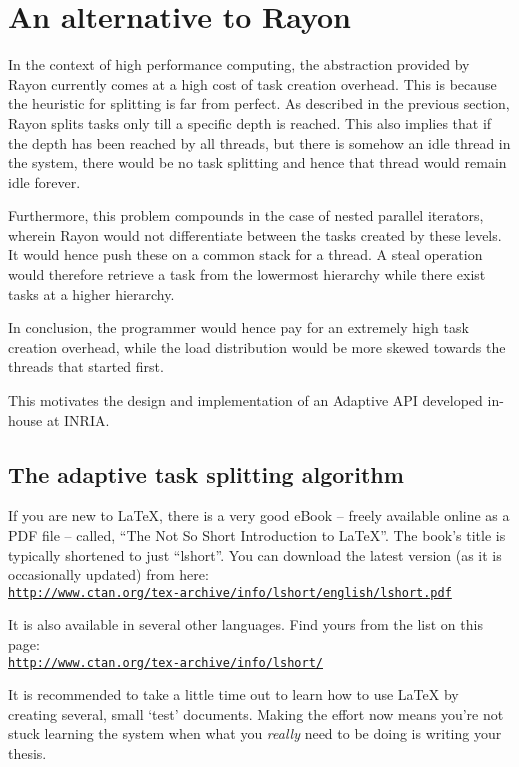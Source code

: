 \section{An alternative to Rayon}
In the context of high performance computing, the abstraction provided by Rayon currently comes at a high cost of task creation overhead. This is because the heuristic for splitting is far from perfect. As described in the previous section, Rayon splits tasks only till a specific depth is reached. This also implies that if the depth has been reached by all threads, but there is somehow an idle thread in the system, there would be no task splitting and hence that thread would remain idle forever.

Furthermore, this problem compounds in the case of nested parallel iterators, wherein Rayon would not differentiate between the tasks created by these levels. It would hence push these on a common stack for a thread. A steal operation would therefore retrieve a task from the lowermost hierarchy while there exist tasks at a higher hierarchy.

In conclusion, the programmer would hence pay for an extremely high task creation overhead, while the load distribution would be more skewed towards the threads that started first.

This motivates the design and implementation of an Adaptive API developed in-house at INRIA.

\subsection{The adaptive task splitting algorithm}

If you are new to \LaTeX{}, there is a very good eBook -- freely available online as a PDF file -- called, ``The Not So Short Introduction to \LaTeX{}''. The book's title is typically shortened to just ``lshort''. You can download the latest version (as it is occasionally updated) from here:\\
\href{http://www.ctan.org/tex-archive/info/lshort/english/lshort.pdf}{\texttt{http://www.ctan.org/tex-archive/info/lshort/english/lshort.pdf}}

It is also available in several other languages. Find yours from the list on this page:\\
\href{http://www.ctan.org/tex-archive/info/lshort/}{\texttt{http://www.ctan.org/tex-archive/info/lshort/}}

It is recommended to take a little time out to learn how to use \LaTeX{} by creating several, small `test' documents. Making the effort now means you're not stuck learning the system when what you \emph{really} need to be doing is writing your thesis.

